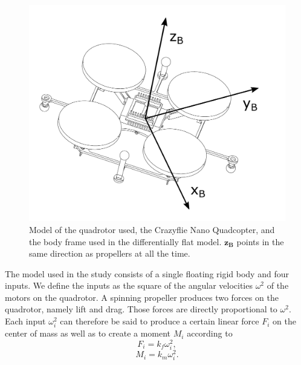 \begin{figure}[t]
	\includegraphics[width=0.9\linewidth]{img_crazyfly}
	\centering
	\caption{\label{fig: img_crazyfly}Model of the quadrotor used, the Crazyflie Nano
		Quadcopter, and the body frame used in the differentially flat
		model. $\boldsymbol{z_{B}}$ points in the same direction as propellers at all the time.}
\end{figure}
The model used in the study consists of a single floating rigid body and four
inputs. We define the inputs as the square of the angular velocities $\omega^2$ of the motors on the quadrotor. A spinning
propeller produces two forces on the quadrotor, namely lift
and drag. Those forces are directly proportional to $\omega^2$. Each
input $\omega_{i}^2$ can therefore be said to produce a certain linear
force $F_{i}$ on the center of mass as well as to create a moment $M_{i}$ according to\begin{equation} \label{eq: force_init}
F_{i} = k_{f}\omega_{i}^2,
\end{equation}\begin{equation} \label{eq: moment_init}
M_{i} = k_{m}\omega_{i}^2.
\end{equation}

